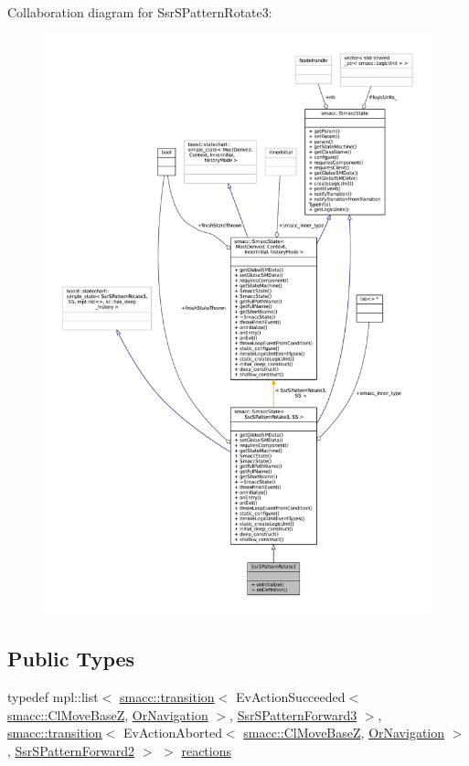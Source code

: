 Collaboration diagram for Ssr\+S\+Pattern\+Rotate3\+:
\nopagebreak
\begin{figure}[H]
\begin{center}
\leavevmode
\includegraphics[width=350pt]{structSsrSPatternRotate3__coll__graph}
\end{center}
\end{figure}
\subsection*{Public Types}
\begin{DoxyCompactItemize}
\item 
typedef mpl\+::list$<$ \hyperlink{classsmacc_1_1transition}{smacc\+::transition}$<$ Ev\+Action\+Succeeded$<$ \hyperlink{classsmacc_1_1ClMoveBaseZ}{smacc\+::\+Cl\+Move\+BaseZ}, \hyperlink{classOrNavigation}{Or\+Navigation} $>$, \hyperlink{structSsrSPatternForward3}{Ssr\+S\+Pattern\+Forward3} $>$, \hyperlink{classsmacc_1_1transition}{smacc\+::transition}$<$ Ev\+Action\+Aborted$<$ \hyperlink{classsmacc_1_1ClMoveBaseZ}{smacc\+::\+Cl\+Move\+BaseZ}, \hyperlink{classOrNavigation}{Or\+Navigation} $>$, \hyperlink{structSsrSPatternForward2}{Ssr\+S\+Pattern\+Forward2} $>$ $>$ \hyperlink{structSsrSPatternRotate3_a2a8df9f21e221d6dc03c8c2edc0ef8b3}{reactions}
\end{DoxyCompactItemize}
